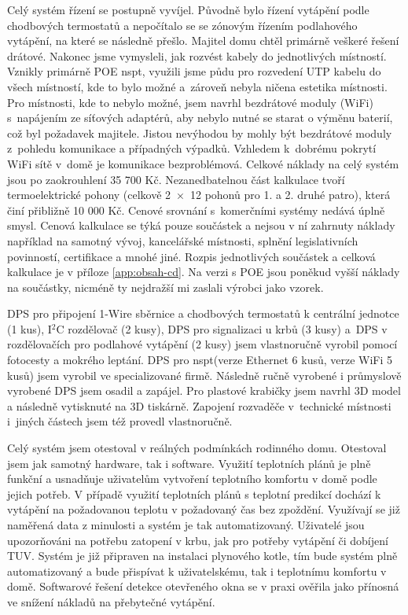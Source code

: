 Celý systém řízení se postupně vyvíjel. Původně bylo řízení vytápění podle chodbových termostatů a nepočítalo se se zónovým řízením podlahového vytápění, na které se následně přešlo. Majitel domu chtěl primárně veškeré řešení drátové. Nakonec jsme vymysleli, jak rozvést kabely do jednotlivých místností. Vznikly primárně POE \acrshort{nspt}, využili jsme půdu pro rozvedení UTP kabelu do všech místností, kde to bylo možné a~zároveň nebyla ničena estetika místnosti. Pro místnosti, kde to nebylo možné, jsem navrhl bezdrátové moduly (WiFi) s~napájením ze síťových adaptérů, aby nebylo nutné se starat o výměnu baterií, což byl požadavek majitele. Jistou nevýhodou by mohly být bezdrátové moduly z~pohledu komunikace a případných výpadků. Vzhledem k~dobrému pokrytí WiFi sítě v~domě je komunikace bezproblémová. Celkové náklady na celý systém jsou po zaokrouhlení 35 700 Kč. Nezanedbatelnou část kalkulace tvoří termoelektrické pohony (celkově 2~×~12 pohonů pro 1. a 2. druhé patro), která činí přibližně 10 000 Kč. Cenové srovnání s~komerčními systémy nedává úplně smysl. Cenová kalkulace se týká pouze součástek a nejsou v ní zahrnuty náklady například na samotný vývoj, kancelářské místnosti, splnění legislativních povinností, certifikace a mnohé jiné. Rozpis jednotlivých součástek a celková kalkulace je v příloze \ref{app:obsah-cd}.  Na verzi s POE jsou poněkud vyšší náklady na součástky, nicméně ty nejdražší mi zaslali výrobci jako vzorek.

DPS pro připojení 1-Wire sběrnice a chodbových termostatů k centrální jednotce (1 kus), I$^{2}$C rozdělovač (2 kusy), DPS pro signalizaci u krbů (3 kusy) a~DPS v rozdělovačích pro podlahové vytápění (2 kusy) jsem vlastnoručně vyrobil pomocí fotocesty a mokrého leptání. DPS pro \acrshort{nspt}(verze Ethernet 6 kusů, verze WiFi 5 kusů) jsem vyrobil ve specializované firmě. Následně ručně vyrobené i průmyslově vyrobené DPS jsem osadil a zapájel. Pro plastové krabičky jsem navrhl 3D model a následně vytisknuté na 3D tiskárně. Zapojení rozvaděče v~technické místnosti i~jiných částech jsem též provedl vlastnoručně.

Celý systém jsem otestoval v reálných podmínkách rodinného domu. Otestoval jsem jak samotný hardware, tak i software. Využití teplotních plánů je plně funkční a usnadňuje uživatelům vytvoření teplotního komfortu v domě podle jejich potřeb. V případě využití teplotních plánů s teplotní predikcí dochází k vytápění na požadovanou teplotu v požadovaný čas bez zpoždění. Využívají se již naměřená data z minulosti a systém je tak automatizovaný. Uživatelé jsou upozorňováni na potřebu zatopení v krbu, jak pro potřeby vytápění či dobíjení TUV. Systém je již připraven na instalaci plynového kotle, tím bude systém plně automatizovaný a bude přispívat k uživatelskému, tak i teplotnímu komfortu v domě. Softwarové řešení detekce otevřeného okna se v praxi ověřila jako přínosná ve snížení nákladů na přebytečné vytápění.

